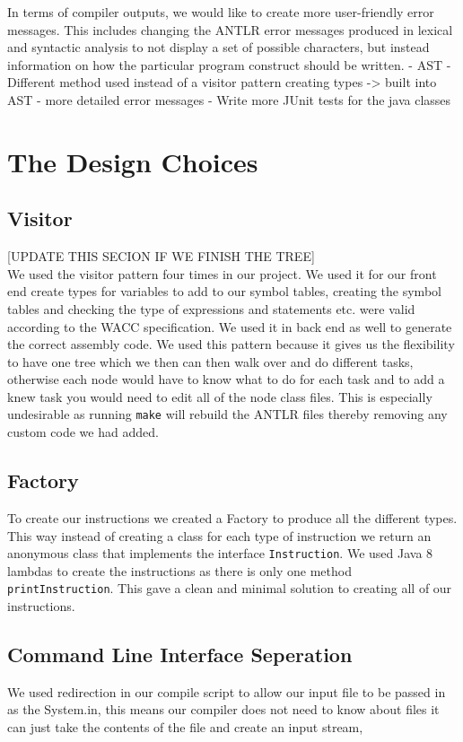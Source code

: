 \documentclass[11pt,a4paper]{article}
\begin{document}
In terms of compiler outputs, we would like to create more user-friendly error messages. This includes changing the ANTLR error messages produced in lexical and syntactic analysis to not display a set of possible characters, but instead information on how the particular program construct should be written.
- AST
- Different method used instead of a visitor pattern creating types -> built into AST
- more detailed error messages
- Write more JUnit tests for the java classes 

\section{The Design Choices}
\label{sec:The Design Choices}

\subsection{Visitor}
\label{sub:Visitor}
[UPDATE THIS SECION IF WE FINISH THE TREE]\\
We used the visitor pattern four times in our project. We used it for our front end create types for variables to add to our symbol tables, creating the symbol tables and checking the type of expressions and statements etc. were valid according to the WACC specification. We used it in back end as well to generate the correct assembly code. We used this pattern because it gives us the flexibility to have one tree which we then can then walk over and do different tasks, otherwise each node would have to know what to do for each task and to add a knew task you would need to edit all of the node class files. This is especially undesirable as running \texttt{make} will rebuild the ANTLR files thereby removing any custom code we had added.

\subsection{Factory}
\label{sub:Factory}
To create our instructions we created a Factory to produce all the different types. This way instead of creating a class for each type of instruction we return an anonymous class that implements the interface \texttt{Instruction}. We used Java 8 lambdas to create the instructions as there is only one method \texttt{printInstruction}. This gave a clean and minimal solution to creating all of our instructions.

\subsection{Command Line Interface Seperation}
\label{sub:Command Line Interface Seperation}
We used redirection in our compile script to allow our input file to be passed in as the System.in, this means our compiler does not need to know about files it can just take the contents of the file and create an input stream,
\end{document}
